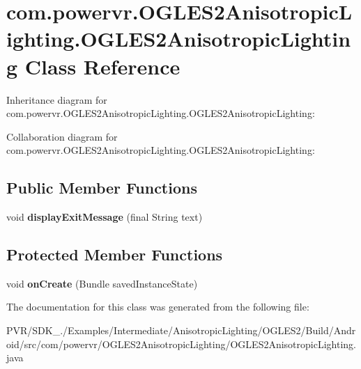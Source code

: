 \hypertarget{classcom_1_1powervr_1_1_o_g_l_e_s2_anisotropic_lighting_1_1_o_g_l_e_s2_anisotropic_lighting}{\section{com.\+powervr.\+O\+G\+L\+E\+S2\+Anisotropic\+Lighting.\+O\+G\+L\+E\+S2\+Anisotropic\+Lighting Class Reference}
\label{classcom_1_1powervr_1_1_o_g_l_e_s2_anisotropic_lighting_1_1_o_g_l_e_s2_anisotropic_lighting}
}


Inheritance diagram for com.\+powervr.\+O\+G\+L\+E\+S2\+Anisotropic\+Lighting.\+O\+G\+L\+E\+S2\+Anisotropic\+Lighting\+:


Collaboration diagram for com.\+powervr.\+O\+G\+L\+E\+S2\+Anisotropic\+Lighting.\+O\+G\+L\+E\+S2\+Anisotropic\+Lighting\+:
\subsection*{Public Member Functions}
\begin{DoxyCompactItemize}
\item 
\hypertarget{classcom_1_1powervr_1_1_o_g_l_e_s2_anisotropic_lighting_1_1_o_g_l_e_s2_anisotropic_lighting_a4a18441887dc2b9719f5615d10d43021}{void {\bfseries display\+Exit\+Message} (final String text)}\label{classcom_1_1powervr_1_1_o_g_l_e_s2_anisotropic_lighting_1_1_o_g_l_e_s2_anisotropic_lighting_a4a18441887dc2b9719f5615d10d43021}

\end{DoxyCompactItemize}
\subsection*{Protected Member Functions}
\begin{DoxyCompactItemize}
\item 
\hypertarget{classcom_1_1powervr_1_1_o_g_l_e_s2_anisotropic_lighting_1_1_o_g_l_e_s2_anisotropic_lighting_a8fb7f12054bf9149e916ac52c2711c0a}{void {\bfseries on\+Create} (Bundle saved\+Instance\+State)}\label{classcom_1_1powervr_1_1_o_g_l_e_s2_anisotropic_lighting_1_1_o_g_l_e_s2_anisotropic_lighting_a8fb7f12054bf9149e916ac52c2711c0a}

\end{DoxyCompactItemize}


The documentation for this class was generated from the following file\+:\begin{DoxyCompactItemize}
\item 
P\+V\+R/\+S\+D\+K\+\_./\+Examples/\+Intermediate/\+Anisotropic\+Lighting/\+O\+G\+L\+E\+S2/\+Build/\+Android/src/com/powervr/\+O\+G\+L\+E\+S2\+Anisotropic\+Lighting/O\+G\+L\+E\+S2\+Anisotropic\+Lighting.\+java\end{DoxyCompactItemize}
